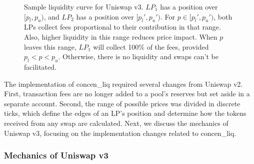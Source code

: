 \documentclass[11pt]{article}
\begin{document}
\vspace{1cm}
\begin{figure}[H]
    \centering
    \vspace{0.5cm}
    \caption{Sample liquidity curve for Uniswap v3. $LP_1$ has a position over $[p_l, p_u)$, and $LP_2$ has a position over $[p_l', p_u')$. For $p \in [p_l', p_u')$, both LPs collect fees proportional to their contribution in that range. Also, higher liquidity in this range reduces price impact. When $p$ leaves this range, $LP_1$ will collect 100\% of the fees, provided $p_l < p < p_u$. Otherwise, there is no liquidity and swaps can't be facilitated.}
    \label{fig:uniswap_v3_sample_liq_curve}
\end{figure}

The implementation of \gls{concen_liq} required several changes from Uniswap v2. First, transaction fees are no longer added to a pool's reserves but set aside in a separate account. Second, the range of possible prices was divided in discrete ticks, which define the edges of an LP's position and determine how the tokens received from any swap are calculated. Next, we discuss the mechanics of Uniswap v3, focusing on the implementation changes related to \gls{concen_liq}.

\subsubsection{Mechanics of Uniswap v3}
\end{document}

